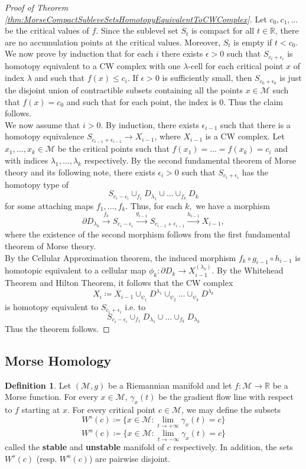 \documentclass[10pt]{article}
\theoremstyle{plain}
\theoremstyle{definition}
\newtheorem{defn}[thm]{Definition} %
\newcommand{\Real}{\mathbb{R}}
\newcommand{\man}{\mathcal{M}}
\newcommand{\xman}{x\in\man}
\newcommand{\mysubsection}[1]{
    \subsection{#1}
}
\begin{document}
\begin{proof}[Proof of Theorem \ref{thm:MorseCompactSubleveSetsHomotopyEquivalentToCWComplex}]
    Let $c_0,c_1,\ldots$ be the critical values of $f$. Since the sublevel set $S_t$ is compact for all $t \in \Real$, there are no accumulation points at the critical values. Moreover, $S_t$ is empty if $t < c_0$. We now prove by induction that for each $i$ there exists $\epsilon>0$ such that $S_{c_i+\epsilon_i}$ is homotopy equivalent to a CW complex with one $\lambda$-cell for each critical point $x$ of index $\lambda$ and such that $f(x) \leq c_i$. If $\epsilon>0$ is sufficiently small, then $S_{c_0+\epsilon_0}$ is just the disjoint union of contractible subsets containing all the points $\xman$ such that $f(x) = c_0$ and such that for each point, the index is $0$. Thus the claim follows.\\
    We now assume that $i>0$. By induction, there exists $\epsilon_{i-1}$ such that there is a homotopy equivalence $S_{c_{i-1} + \epsilon_{i-1}} \to X _{i-1}$, where $X_{i-1}$ is a CW complex. Let $x_1,\ldots,x_k\in\man$ be the critical points such that $f(x_1)=\dots=f(x_k)=c_i$ and with indices $\lambda_1,\ldots,\lambda_k$ respectively. By the second fundamental theorem of Morse theory and its following note, there exists $\epsilon_i > 0$ such that $S_{c_i + \epsilon_i}$ has the homotopy type of 
        $$S_{c_i - \epsilon_i} \cup_{f_1} D_{\lambda_1} \cup \ldots \cup_{f_k} D_k$$
    for some attaching maps $f_1,\ldots,f_k$. Thus, for each $k,$ we have a morphism 
        $$\partial D_{\lambda_k} \xrightarrow[]{f_k} S_{c_i-\epsilon_i} \xrightarrow[]{g_{i-1}} S_{c_{i-1} +\epsilon_{i-1}} \xrightarrow[]{h_{i-1}} X_{i-1}, $$
    where the existence of the second morphism follows from the first fundamental theorem of Morse theory.\\
    By the Cellular Approximation theorem, the induced morphism $f_k \circ g_{i-1} \circ h_{i-1}$ is homotopic equivalent to a cellular map $\phi_k : \partial D_k \to X_{i-1}^{(\lambda_k)}$. By the Whitehead Theorem and Hilton Theorem, it follows that the CW complex 
        $$X_i \coloneqq X_{i-1} \cup_{\psi_1} D^{\lambda_1} \cup_{\psi_2} \ldots \cup_{\psi_k} D^{\lambda_k}$$
    is homotopy equivalent to $S_{c_i+\epsilon_i}$ i.e. to
        $$S_{c_i-\epsilon_i} \cup_{f_1} D_{\lambda_1} \cup \ldots \cup_{f_k} D_{\lambda_k}$$
    Thus the theorem follows.
\end{proof}

\mysubsection{Morse Homology}
\begin{defn}
    Let $(\man,g)$ be a Riemannian manifold and let $f:\man \to \Real$ be a Morse function. For every $\xman$, $\gamma_x(t)$ be the gradient flow line with respect to $f$ starting at $x$. For every critical point $c\in\man$, we may define the subsets
        $$W^s(c) \coloneqq \{ \xman : \lim\limits_{t\to +\infty}\gamma_x(t) = c\}$$
        $$W^u(c) \coloneqq \{ \xman : \lim\limits_{t\to -\infty}\gamma_x(t) = c\}$$
    called the \textbf{stable} and \textbf{unstable} manifold of $c$ respectively. In addition, the sets $W^s(c)$ (resp. $W^u(c)$) are pairwise disjoint. 
\end{defn}
\end{document}
